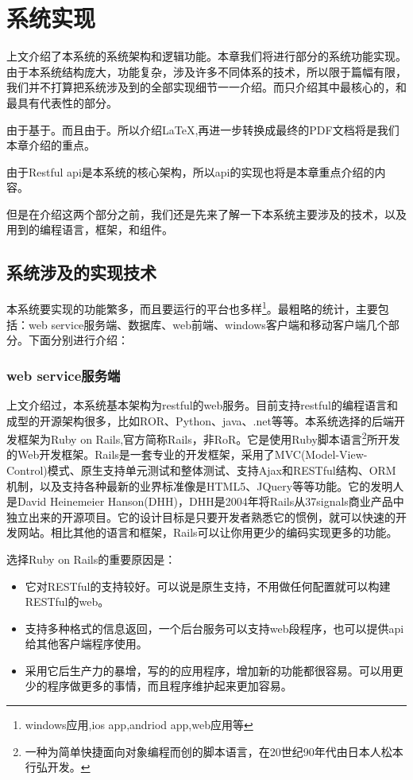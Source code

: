 
\chapter{系统实现}
\label{chap:achieve}

上文介绍了本系统的系统架构和逻辑功能。本章我们将进行部分的系统功能实现。由于本系统结构庞大，功能复杂，涉及许多不同体系的技术，所以限于篇幅有限，我们并不打算把系统涉及到的全部实现细节一一介绍。而只介绍其中最核心的，和最具有代表性的部分。

由于基于。而且由于。所以介绍\LaTeX,再进一步转换成最终的PDF文档将是我们本章介绍的重点。

由于Restful api是本系统的核心架构，所以api的实现也将是本章重点介绍的内容。

但是在介绍这两个部分之前，我们还是先来了解一下本系统主要涉及的技术，以及用到的编程语言，框架，和组件。

\section{系统涉及的实现技术}
\label{sec:language}

本系统要实现的功能繁多，而且要运行的平台也多样\footnote{windows应用,ios app,andriod app,web应用等}。最粗略的统计，主要包括：web service服务端、数据库、web前端、windows客户端和移动客户端几个部分。下面分别进行介绍：

\subsection{web service服务端}
\label{sec:webservice}

上文介绍过，本系统基本架构为restful的web服务。目前支持restful的编程语言和成型的开源架构很多，比如ROR、Python、java、.net等等。本系统选择的后端开发框架为Ruby on Rails,官方简称Rails，非RoR。它是使用Ruby脚本语言\footnote{一种为简单快捷面向对象编程而创的脚本语言，在20世纪90年代由日本人松本行弘开发。}所开发的Web开发框架。Rails是一套专业的开发框架，采用了MVC(Model-View-Control)模式、原生支持单元测试和整体测试、支持Ajax和RESTful结构、ORM机制，以及支持各种最新的业界标准像是HTML5、JQuery等等功能。它的发明人是David Heinemeier Hanson(DHH)，DHH是2004年将Rails从37signals商业产品中独立出来的开源项目。它的设计目标是只要开发者熟悉它的惯例，就可以快速的开发网站。相比其他的语言和框架，Rails可以让你用更少的编码实现更多的功能。

选择Ruby on Rails的重要原因是：
\begin{itemize}
\item 它对RESTful的支持较好。可以说是原生支持，不用做任何配置就可以构建RESTful的web。
\item 支持多种格式的信息返回，一个后台服务可以支持web段程序，也可以提供api给其他客户端程序使用。
\item 采用它后生产力的暴增，写的的应用程序，增加新的功能都很容易。可以用更少的程序做更多的事情，而且程序维护起来更加容易。
\end{itemize}

